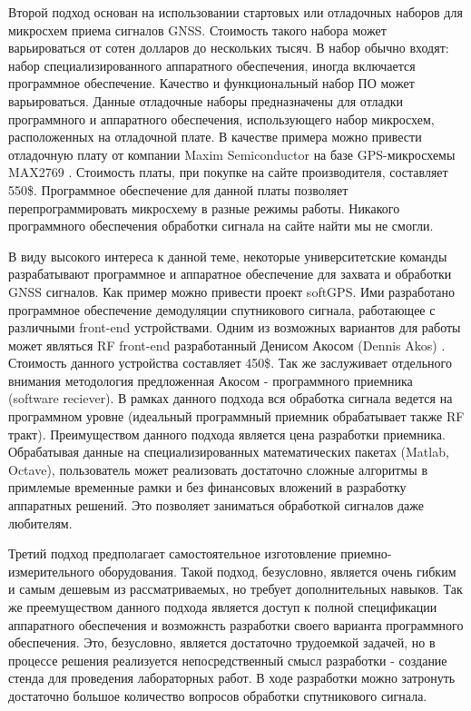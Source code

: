 \documentclass[a4paper,12pt]{article}
\numberwithin{table}{section}
\begin{document}
Второй подход основан на использовании стартовых или отладочных наборов для микросхем приема сигналов GNSS.
Стоимость такого набора может варьироваться от сотен долларов до нескольких тысяч.
В набор обычно входят: набор специализированного аппаратного обеспечения, иногда включается программное обеспечение.
Качество и функциональный набор ПО может варьироваться.
Данные отладочные наборы предназначены для отладки программного и аппаратного обеспечения, использующего набор
микросхем, расположенных на отладочной плате.
В качестве примера можно привести отладочную плату от компании Maxim Semiconductor на базе GPS-микросхемы MAX2769 \cite{max_evkit}.
Стоимость платы, при покупке на сайте производителя, составляет 550\$.
Программное обеспечение для данной платы позволяет перепрограммировать микросхему в разные режимы работы.
Никакого программного обеспечения обработки сигнала на сайте найти мы не смогли.

В виду высокого интереса к данной теме, некоторые университетские команды разрабатывают программное и аппаратное обеспечение
для захвата и обработки GNSS сигналов.
Как пример можно привести проект softGPS.
Ими разработано программное обеспечение демодуляции спутникового сигнала, работающее с различными front-end устройствами.
Одним из возможных вариантов для работы может являться RF front-end разработанный Денисом Акосом (Dennis Akos) \cite{akos_frontend}.
Стоимость данного устройства составляет 450\$.
Так же заслуживает отдельного внимания методология предложенная Акосом - программного приемника (software reciever).
В рамках данного подхода вся обработка сигнала ведется на программном уровне (идеальный программный приемник обрабатывает также RF тракт).
Преимуществом данного подхода является цена разработки приемника.
Обрабатывая данные на специализированных математических пакетах (Matlab, Octave), пользователь может реализовать достаточно сложные алгоритмы в примлемые
временные рамки и без финансовых вложений в разработку аппаратных решений. Это позволяет заниматься обработкой сигналов даже любителям.

Третий подход предполагает самостоятельное изготовление приемно-измерительного оборудования.
Такой подход, безусловно, является очень гибким и самым дешевым из рассматриваемых, но требует дополнительных навыков.
Так же преемуществом данного подхода является доступ к полной спецификации аппаратного обеспечения и возможнсть
разработки своего варианта программного обеспечения.
Это, безусловно, является достаточно трудоемкой задачей, но в процессе решения реализуется непосредственный
смысл разработки - создание стенда для проведения лабораторных работ.
В ходе разработки можно затронуть достаточно большое количество вопросов обработки спутникового сигнала. 
\end{document}

